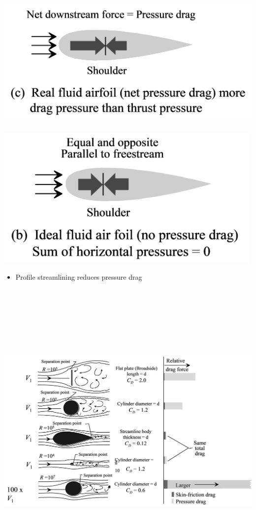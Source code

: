 \documentclass[
]{book}
\providecommand{\tightlist}{%
  \setlength{\itemsep}{0pt}\setlength{\parskip}{0pt}}
\begin{document}
\includegraphics[width=5.5in,height=2.644in]{media/05/image47.svg}

\includegraphics[width=5.192in,height=2.75in]{media/05/image48.svg}

\begin{itemize}
\tightlist
\item
  Profile streamlining reduces pressure drag
\end{itemize}

\includegraphics[width=8.8in,height=6in]{media/05/image49.svg}
\end{document}
